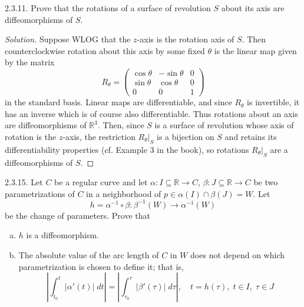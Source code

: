 \documentclass[10pt]{scrartcl}
\providecommand{\RR}{\mathbb R}
\providecommand{\ii}{\item}
\providecommand{\inv}{^{-1}}
\providecommand{\dif}{\;d}
\newenvironment{soln}{\begin{proof}[Solution]}{\end{proof}}
\providecommand{\abs}[1]{\left|#1\right|}
\begin{document}
\begin{problem*}2.3.11.
	Prove that the rotations of a surface of revolution $S$ about its axis
	are diffeomorphisms of $S$.
\end{problem*}

\begin{soln}
	Suppose WLOG that the $z$-axis is the rotation axis of $S$.
	Then counterclockwise rotation about this axis by some fixed $\theta$
	is the linear map given by the matrix
	\[R_\theta = \begin{pmatrix}
		\cos\theta & -\sin\theta & 0\\
		\sin\theta & \cos\theta & 0\\
		0 & 0 & 1
	\end{pmatrix}\]
	in the standard basis.
	Linear maps are differentiable, and
	since $R_\theta$ is invertible, it has an inverse
	which is of course also differentiable.
	Thus rotations about an axis are diffeomorphisms of $\RR^3$.
	Then, since $S$ is a surface of revolution whose axis of rotation
	is the $z$-axis, the restriction $R_\theta|_S$ is a bijection on $S$
	and retains its differentiability properties (cf. Example 3 in the book),
	so rotations $R_\theta|_S$ are a diffeomorphisms of $S$.
\end{soln}

\begin{problem*}2.3.15.
	Let $C$ be a regular curve and let $\alpha\colon I\subseteq\RR\to C$,
	$\beta\colon J\subseteq\RR\to C$ be two parametrizations of $C$
	in a neighborhood of $p\in\alpha(I)\cap \beta(J) = W$. Let
	\[h = \alpha\inv\circ\beta\colon\beta\inv(W)\to\alpha\inv(W)\]
	be the change of parameters. Prove that
	\begin{enumerate}[(a)]
		\ii $h$ is a diffeomorphism.
		\ii The absolute value of the arc length of $C$ in $W$
		does not depend on which parametrization is chosen to define it;
		that is,
		\[\abs{\int_{t_0}^t |\alpha'(t)|\dif t} =
		\abs{\int_{\tau_0}^\tau |\beta'(\tau)|\dif \tau},\quad
		t=h(\tau),\;t\in I,\;\tau\in J\]
	\end{enumerate}
\end{problem*}
\end{document}
